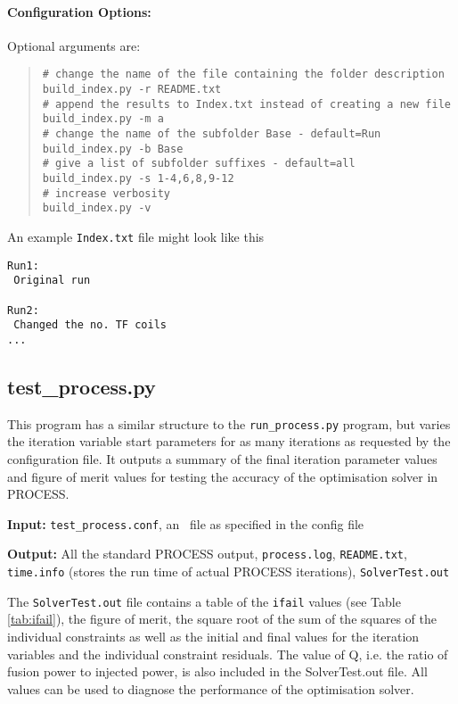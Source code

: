 \paragraph{Configuration Options:}

Optional arguments are:
\begin{quote}
\begin{verbatim}
# change the name of the file containing the folder description
build_index.py -r README.txt 
# append the results to Index.txt instead of creating a new file
build_index.py -m a
# change the name of the subfolder Base - default=Run
build_index.py -b Base 
# give a list of subfolder suffixes - default=all
build_index.py -s 1-4,6,8,9-12 
# increase verbosity
build_index.py -v
\end{verbatim}
\end{quote}

An example \texttt{Index.txt} file might look like this
\begin{framed}
\begin{verbatim}
Run1:
 Original run

Run2:
 Changed the no. TF coils
...
\end{verbatim}
\end{framed}

\subsection{test\_process.py}

This program has a similar structure to the \texttt{run\_process.py} program, but varies the iteration variable start parameters for as many iterations as requested by the configuration file. It outputs a summary of the final iteration parameter values and figure of merit values for testing the accuracy of the optimisation solver in PROCESS.

\begin{description}
\item{\textbf{Input:}}
\texttt{test\_process.conf}, an \indat\ file as specified in the config file
                                
\item{\textbf{Output:}} All the standard
  PROCESS output, \texttt{process.log}, \texttt{README.txt}, \texttt{time.info} (stores the run time of actual PROCESS iterations), \texttt{SolverTest.out}  
\end{description}
The \texttt{SolverTest.out} file contains a table of the \texttt{ifail} values (see Table \ref{tab:ifail}), the figure of merit, the square root of the sum of the squares of the individual constraints as well as the initial and final values for the iteration variables and the individual constraint residuals. The value of Q, i.e. the ratio of
fusion power to injected power, is also included in the SolverTest.out file. All values can be used to diagnose the performance of the optimisation solver.


